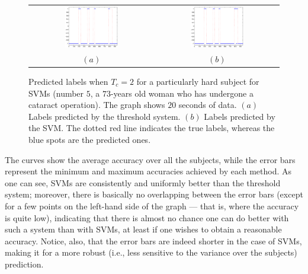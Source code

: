 \documentclass[a4paper,10pt,conference]{ieeeconf}
\begin{document}
\begin{figure}[!t]
  \centering
    \begin{tabular}{cc}
      \includegraphics[width=0.45\textwidth]{predictionT.eps} &
      \includegraphics[width=0.45\textwidth]{predictionS.eps} \\
      $(a)$ & $(b)$
    \end{tabular}
    \caption{Predicted labels when $T_c=2$ for a particularly hard
    subject for SVMs (number $5$, a $73$-years old woman who has
    undergone a cataract operation). The graph shows $20$ seconds of
    data. $(a)$ Labels predicted by the threshold system. $(b)$
    Labels predicted by the SVM. The dotted red line indicates the
    true labels, whereas the blue spots are the predicted ones.}
    \label{fig:prediction}
\end{figure}

The curves show the average accuracy over all the subjects, while the
error bars represent the minimum and maximum accuracies achieved by
each method. As one can see, SVMs are consistently and uniformly
better than the threshold system; moreover, there is basically no
overlapping between the error bars (except for a few points on the
left-hand side of the graph --- that is, where the accuracy is quite
low), indicating that there is almost no chance one can do better with
such a system than with SVMs, at least if one wishes to obtain a
reasonable accuracy. Notice, also, that the error bars are indeed
shorter in the case of SVMs, making it for a more robust (i.e., less
sensitive to the variance over the subjects) prediction.
\end{document}
